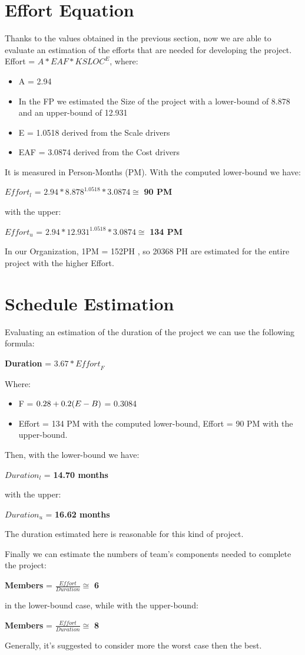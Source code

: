 \section{Effort Equation}
Thanks to the values obtained in the previous section, now we are able to evaluate an estimation of the efforts that are needed for developing the project.  Effort = $A * EAF * KSLOC^E $, where:  
\begin{itemize}
\item A = 2.94 
\item In the FP we estimated the Size of the project with a lower-bound of 8.878 and an upper-bound of 12.931
\item E = 1.0518 derived from the Scale drivers
\item EAF = 3.0874 derived from the Cost drivers
\end{itemize}
It is measured in Person-Months (PM).
With the computed lower-bound we have: 
\\\begin{center} $Effort_l$ = $ 2.94 * 8.878^{1.0518} * 3.0874 \cong$ \textbf{90 PM}\end{center}
with the upper:
\\\begin{center} $Effort_u$ = $2.94 * 12.931^{1.0518} * 3.0874 \cong$ \textbf{134 PM} \end{center}

In our Organization, 1PM = 152PH , so 20368 PH are estimated for the entire project with the higher Effort.

\section{Schedule Estimation}
Evaluating an estimation of the duration of the project we can use the following formula:
\begin{center}\textbf{Duration} = $3.67 * \textit{Effort}_F$  \end{center}
Where:
\begin{itemize}
\item F = $0.28 + 0.2 \* (E - B)$ = 0.3084
\item Effort = 134 PM with the computed lower-bound, Effort = 90 PM with the upper-bound.
\end{itemize}
Then, with the lower-bound we have: 
\begin{center}$Duration_l$ = \textbf{14.70 months} \end{center}
with the upper:
\begin{center}$Duration_u$ = \textbf{16.62 months} \end{center}
The duration estimated here is reasonable for this kind of project.

Finally we can estimate the numbers of team's components needed to complete the project:
\begin{center}\textbf{Members} = $\frac{Effort}{Duration} \cong$ \textbf{6}\end{center}
in the lower-bound case, while with the upper-bound:
\begin{center}\textbf{Members} = $\frac{Effort}{Duration} \cong$ \textbf{8}\end{center}
Generally, it's suggested to consider more the worst case then the best.
